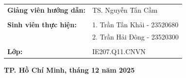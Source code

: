 \documentclass[12pt,a4paper]{article}
\begin{document}
\begin{titlepage}
\begin{center}
        \vfill %

        \begin{table}[h]
            \centering
            \renewcommand{\arraystretch}{1.2} %
            \begin{tabular}{p{5cm} l} %
                \textbf{Giảng viên hướng dẫn:} & TS. Nguyễn Tấn Cầm \\
                & \\ %
                \textbf{Sinh viên thực hiện:}  & 1. Trần Tấn Khải - 23520680 \\ %
                                               & 2. Trần Hải Đông - 23520300 \\   %
                & \\ %
                \textbf{Lớp:}                  & IE207.Q11.CNVN
            \end{tabular}
        \end{table}

        \vfill %
        
        \textbf{TP. Hồ Chí Minh, tháng 12 năm 2025}
        \vspace{1cm} %
    \end{center}
\end{titlepage}
\end{document}

